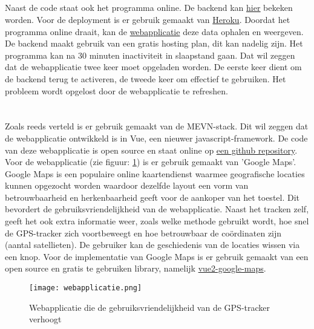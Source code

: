 \subsection{}
Naast de code staat ook het programma online. De backend kan \href{https://indy-bap-backend.herokuapp.com/api/locations}{\underline{hier}} bekeken worden. Voor de deployment is er gebruik gemaakt van \href{www.heroku.com}{Heroku}. Doordat het programma online draait, kan de \href{https://indy-bap-frontend.netlify.com/}{webapplicatie} deze data ophalen en weergeven.
\newline
De backend maakt gebruik van een gratis hosting plan, dit kan nadelig zijn. Het programma kan na 30 minuten inactiviteit in slaapstand gaan. Dat wil zeggen dat de webapplicatie twee keer moet opgeladen worden. De eerste keer dient om de backend terug te activeren, de tweede keer om effectief te gebruiken. Het probleem wordt opgelost door de webapplicatie te refreshen.
\pagebreak
\section{}
\label{ch:frontend}

\subsection{}
Zoals reeds verteld is er gebruik gemaakt van de MEVN-stack. Dit wil zeggen dat de webapplicatie ontwikkeld is in Vue, een nieuwer javascript-framework. De code van deze webapplicatie is open source en staat online op \underline{\href{https://github.com/IndyVC/bap-frontend}{een github repository}}.
\newline
Voor de webapplicatie (zie figuur: \ref{fig:webapplicatie}) is er gebruik gemaakt van 'Google Maps'. Google Maps is een populaire online kaartendienst waarmee geografische locaties kunnen opgezocht worden waardoor dezelfde layout een vorm van betrouwbaarheid en herkenbaarheid geeft voor de aankoper van het toestel. Dit bevordert de gebruiksvriendelijkheid van de webapplicatie. Naast het tracken zelf, geeft het ook extra informatie weer, zoals welke methode gebruikt wordt, hoe snel de GPS-tracker zich voortbeweegt en hoe betrouwbaar de coördinaten zijn (aantal satellieten). De gebruiker kan de geschiedenis van de locaties wissen via een knop.
\newline
Voor de implementatie van Google Maps is er gebruik gemaakt van een open source en gratis te gebruiken library, namelijk \href{https://www.npmjs.com/package/vue2-google-maps}{vue2-google-maps}.
\begin{figure}
	\texttt{[image: webapplicatie.png]}
	\caption{Webapplicatie die de gebruiksvriendelijkheid van de GPS-tracker verhoogt}
	\label{fig:webapplicatie}
\end{figure}

